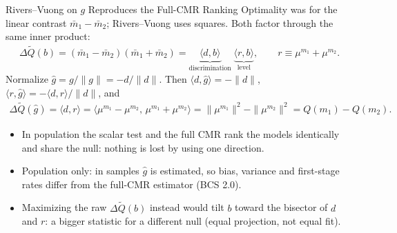 \documentclass[aspectratio=169,10pt]{beamer}
\begin{document}
\begin{frame}{Rivers--Vuong on $g$ Reproduces the Full-CMR Ranking}
\small
Optimality was for the linear contrast $\bar m_1 - \bar m_2$; Rivers--Vuong uses squares. Both factor through the same inner product:
\begin{align*}
\Delta\widetilde Q(b) = (\bar m_1 - \bar m_2)(\bar m_1 + \bar m_2) = \underbrace{\langle d, b \rangle}_{\text{discrimination}}\; \underbrace{\langle r, b \rangle}_{\text{level}},
\qquad r \equiv \mu^{m_1} + \mu^{m_2} .
\end{align*}
Normalize $\hat g = g/\|g\| = -d/\|d\|$. Then $\langle d, \hat g \rangle = -\|d\|$, $\langle r, \hat g \rangle = -\langle d, r \rangle / \|d\|$, and
\begin{align*}
\Delta\widetilde Q(\hat g) = \langle d, r \rangle = \langle \mu^{m_1} - \mu^{m_2},\, \mu^{m_1} + \mu^{m_2} \rangle = \|\mu^{m_1}\|^2 - \|\mu^{m_2}\|^2 = Q(m_1) - Q(m_2).
\end{align*}
\begin{itemize}
\item In population the scalar test and the full CMR \alert{rank the models identically and share the null}: nothing is lost by using one direction.
\item Population only: in samples $\widehat g$ is estimated, so bias, variance and first-stage rates differ from the full-CMR estimator (BCS 2.0).
\item Maximizing the raw $\Delta\widetilde Q(b)$ instead would tilt $b$ toward the bisector of $d$ and $r$: a bigger statistic for a different null (equal projection, not equal fit).
\end{itemize}
\end{frame}
\end{document}

